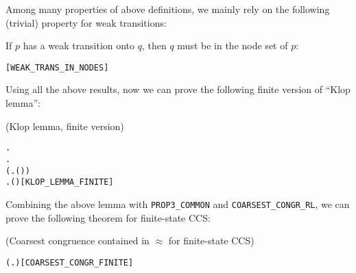 Among many properties of above definitions, we mainly rely on the
following (trivial) property for weak transitions:
\begin{proposition}
If $p$ has a weak transition onto $q$, then $q$ must be in the node set of $p$:
\begin{alltt}
\HOLTokenTurnstile{}  \HOLTokenWeakTransBegin{}\HOLTokenWeakTransEnd {} \HOLSymConst{\HOLTokenImp{}}  \HOLSymConst{\HOLTokenIn{}}  \hfill[WEAK_TRANS_IN_NODES]
\end{alltt}
\end{proposition}

Using all the above results, now we can  prove the following finite
version of ``Klop lemma'':
\begin{lemma}{(Klop lemma,  finite version)}
\label{lem:klop-lemma-finite}
\begin{alltt}
\HOLTokenTurnstile{} \HOLSymConst{\HOLTokenForall{}} .
         \HOLSymConst{\HOLTokenConj{}}   \HOLSymConst{\HOLTokenImp{}}
       \HOLSymConst{\HOLTokenExists{}}.
             \HOLSymConst{\HOLTokenConj{}} (\HOLSymConst{\HOLTokenForall{}} .  \HOLTokenWeakTransBegin{}\HOLTokenWeakTransEnd {} \HOLSymConst{\HOLTokenImp{}} \HOLSymConst{\HOLTokenNeg{}}( \HOLSymConst{\HOLTokenWeakEQ} )) \HOLSymConst{\HOLTokenConj{}}
           \HOLSymConst{\HOLTokenForall{}} .  \HOLTokenWeakTransBegin{}\HOLTokenWeakTransEnd {} \HOLSymConst{\HOLTokenImp{}} \HOLSymConst{\HOLTokenNeg{}}( \HOLSymConst{\HOLTokenWeakEQ} )\hfill{[KLOP_LEMMA_FINITE]}
\end{alltt}
\end{lemma}

Combining the above lemma with \texttt{PROP3_COMMON} and \texttt{COARSEST_CONGR_RL},
we can  prove the following theorem for finite-state CCS:
\begin{theorem}{(Coarsest congruence contained in $\approx$ for
    finite-state CCS)}
\begin{alltt}
\HOLTokenTurnstile{}   \HOLSymConst{\HOLTokenConj{}}   \HOLSymConst{\HOLTokenImp{}}
   ( \HOLSymConst{\HOLTokenObsCongr}  \HOLSymConst{\HOLTokenEquiv{}} \HOLSymConst{\HOLTokenForall{}}.  \HOLSymConst{\ensuremath{+}}  \HOLSymConst{\HOLTokenWeakEQ}  \HOLSymConst{\ensuremath{+}} )\hfill[COARSEST_CONGR_FINITE]
\end{alltt}
\end{theorem}


